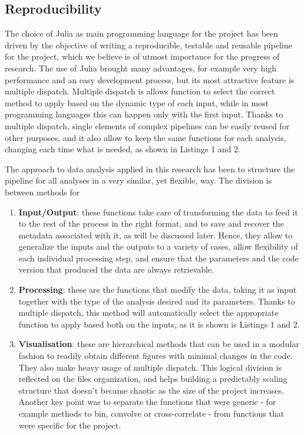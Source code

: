 \subsection{Reproducibility}
The choice of Julia as main programming language for the project has been driven by the objective of writing a reproducible, testable and reusable pipeline for the project, which we believe is of utmost importance for the progress of research. 
The use of Julia brought many advantages, for example very high performance and an easy development process, but its most attractive feature is multiple dispatch. Multiple dispatch is allows function to select the correct method to apply based on the dynamic type of each input, while in most programming languages this can happen only with the first input. Thanks to multiple dispatch, single elements of complex pipelines can be easily reused for other purposes, and it also allow to keep the same functions for each analysis, changing each time what is needed, as shown in Listings 1 and 2.

The approach to data analysis applied in this research has been to structure the pipeline for all analyses in a very similar, yet flexible, way. The division is between methods for
\begin{enumerate}
	\item \textbf{Input/Output}: these functions take care of transforming the data to feed it to the rest of the process in the right format, and to save and recover the metadata associated with it, as will be discussed later. Hence, they allow to generalize the inputs and the outputs to a variety of cases, allow flexibility of each individual processing step, and ensure that the parameters and the code version that produced the data are always retrievable.
	\item \textbf{Processing}: these are the functions that modify the data, taking it as input together with the type of the analysis desired and its parameters. Thanks to multiple dispatch, this method will automatically select the appropriate function to apply based both on the inputs, as it is shown is Listings 1 and 2.
	\item \textbf{Visualisation}:  these are hierarchical methods that can be used in a modular fashion to readily obtain different figures with minimal changes in the code. They also make heavy usage of multiple dispatch. This logical division is reflected on the files organization, and helps building a predictably scaling structure that doesn't became chaotic as the size of the project increases. Another key point was to separate the functions that were generic - for example methods to bin, convolve or cross-correlate - from functions that were specific for the project. 
\end{enumerate}

